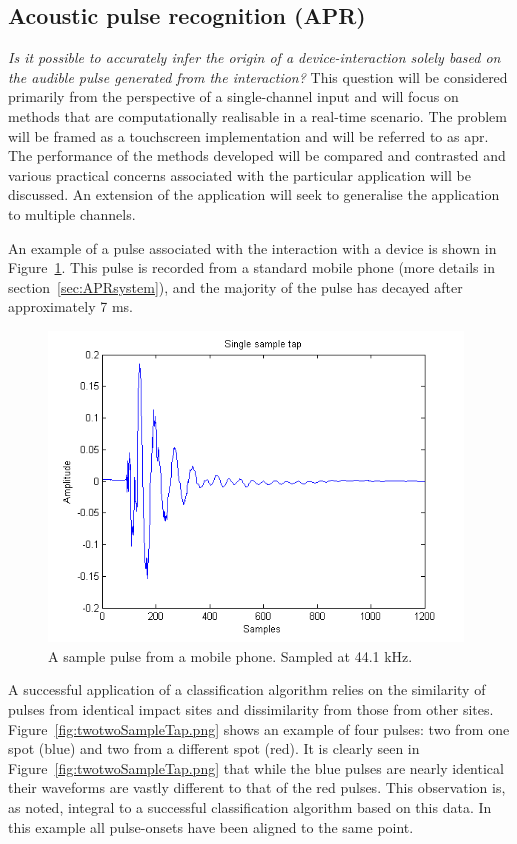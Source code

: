 \subsection{Acoustic pulse recognition (APR)}
\emph{Is it possible to accurately infer the origin of a device-interaction solely based on the audible pulse generated from the interaction?}
This question will be considered primarily from the perspective of a single-channel input and will focus on methods that are computationally realisable in a real-time scenario. The problem will be framed as a touchscreen implementation and will be referred to as \gls{apr}. The performance of the methods developed will be compared and contrasted and various practical concerns associated with the particular application will be discussed. An extension of the application will seek to generalise the application to multiple channels.

An example of a pulse associated with the interaction with a device is shown in Figure~\ref{fig:singleSampleTap.png}. This pulse is recorded from a standard mobile phone (more details in section~\ref{sec:APRsystem}), and the majority of the pulse has decayed after approximately 7 ms.

\begin{figure}
  \begin{center}
    \includegraphics[width=110mm]{singleSampleTap.png}
    \caption{A sample pulse from a mobile phone. Sampled at 44.1 kHz.}\label{fig:singleSampleTap.png}
  \end{center}
\end{figure}

A successful application of a classification algorithm relies on the similarity of pulses from identical impact sites and dissimilarity from those from other sites. Figure~\ref{fig:twotwoSampleTap.png} shows an example of four pulses: two from one spot (blue) and two from a different spot (red). It is clearly seen in Figure~\ref{fig:twotwoSampleTap.png} that while the blue pulses are nearly identical their waveforms are vastly different to that of the red pulses. This observation is, as noted, integral to a successful classification algorithm based on this data. In this example all pulse-onsets have been aligned to the same point.

